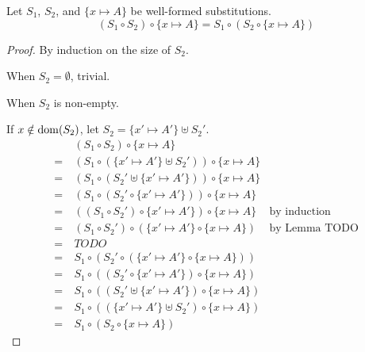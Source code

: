 \begin{lemma} \label{lem:assocsinglesubst}
Let $S_1$, $S_2$, and $\{x\mapsto A\}$ be well-formed substitutions.
\[ (S_1\circ S_2) \circ \{x\mapsto A\} = S_1 \circ (S_2 \circ \{x\mapsto A\}) \]
\end{lemma}
\begin{proof}
By induction on the size of $S_2$.

When $S_2=\emptyset$, trivial.

When $S_2$ is non-empty.

If $x\notin \mathop{\mathrm{dom}}(S_2)$, let $S_2=\{x'\mapsto A'\}\uplus S_2'$.
\begin{align*}
 &~ (S_1\circ S_2) \circ \{x\mapsto A\} \\
=&~ (S_1\circ(\{x'\mapsto A'\}\uplus S_2')) \circ \{x\mapsto A\} \\
=&~ (S_1\circ(S_2'\uplus\{x'\mapsto A'\})) \circ \{x\mapsto A\} \\
=&~ (S_1\circ(S_2'\circ\{x'\mapsto A'\})) \circ \{x\mapsto A\} \\
=&~ ((S_1\circ S_2')\circ\{x'\mapsto A'\}) \circ \{x\mapsto A\}
	& \text{by induction} \\
=&~ (S_1\circ S_2')\circ(\{x'\mapsto A'\} \circ \{x\mapsto A\})
	& \text{by Lemma TODO} \\
=&~ TODO \\
=&~ S_1 \circ (S_2'\circ (\{x'\mapsto A'\} \circ \{x\mapsto A\})) \\
=&~ S_1 \circ ((S_2'\circ \{x'\mapsto A'\}) \circ \{x\mapsto A\}) \\
=&~ S_1 \circ ((S_2'\uplus \{x'\mapsto A'\}) \circ \{x\mapsto A\}) \\
=&~ S_1 \circ ((\{x'\mapsto A'\}\uplus S_2') \circ \{x\mapsto A\}) \\
=&~ S_1 \circ (S_2 \circ \{x\mapsto A\})
\end{align*}



\end{proof}

